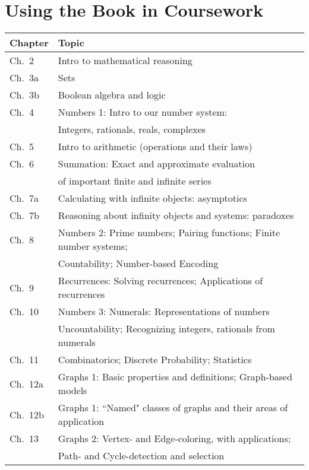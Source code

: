 \documentclass{article}
\begin{document}
\section*{Using the Book in Coursework}

\bigskip

{\footnotesize

\begin{tabular}{|l|l|}
\hline
 {\bf Chapter} & {\bf Topic} \\
\hline
\hline
Ch.~2    & Intro to mathematical reasoning \\
Ch.~3a  & Sets \\
Ch.~3b  & Boolean algebra and logic \\
Ch.~4  & Numbers 1: Intro to our number system: \\
            & \hspace*{.1in}Integers, rationals, reals, complexes \\
Ch.~5  &Intro to arithmetic (operations and their laws) \\
Ch.~6  & Summation: Exact and approximate evaluation \\
            & of important finite and infinite series   \\
Ch.~7a & Calculating with infinite objects: asymptotics \\
Ch.~7b  & Reasoning about infinity objects and systems: paradoxes \\
Ch.~8  & Numbers 2: Prime numbers; Pairing functions; Finite number systems; \\
            & \hspace*{.1in}Countability; Number-based Encoding  \\
Ch.~9  & Recurrences: Solving recurrences; Applications of recurrences \\
Ch.~10 & Numbers 3: Numerals: Representations of numbers \\
             & \hspace*{.1in}Uncountability; Recognizing integers, rationals from numerals \\
Ch.~11  & Combinatorics; Discrete Probability; Statistics \\
Ch.~12a & Graphs 1: Basic properties and definitions; Graph-based models \\
Ch.~12b & Graphs 1: ``Named" classes of graphs and their areas of application \\
Ch.~13 & Graphs 2: Vertex- and Edge-coloring, with applications; \\
             & \hspace*{.1in}Path- and Cycle-detection and selection \\
\hline
\end{tabular}
}
\end{document}
